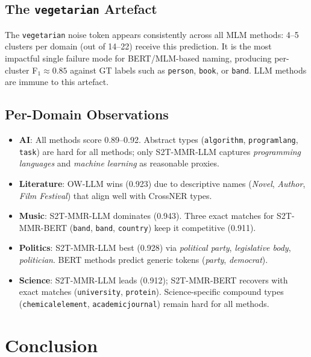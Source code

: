 \documentclass[11pt,a4paper]{article}
\begin{document}
\subsection{The \texttt{vegetarian} Artefact}

The \texttt{vegetarian} noise token appears consistently across all MLM
methods: 4--5 clusters per domain (out of 14--22) receive this prediction.
It is the most impactful single failure mode for BERT/MLM-based naming,
producing per-cluster F$_1 \approx 0.85$ against GT labels such as
\texttt{person}, \texttt{book}, or \texttt{band}.
LLM methods are immune to this artefact.

\subsection{Per-Domain Observations}

\begin{itemize}[leftmargin=1.5em]
  \item \textbf{AI}: All methods score 0.89--0.92. Abstract types
    (\texttt{algorithm}, \texttt{programlang}, \texttt{task}) are hard for
    all methods; only S2T-MMR-LLM captures \textit{programming languages}
    and \textit{machine learning} as reasonable proxies.
  \item \textbf{Literature}: OW-LLM wins (0.923) due to descriptive names
    (\textit{Novel}, \textit{Author}, \textit{Film Festival}) that align
    well with CrossNER types.
  \item \textbf{Music}: S2T-MMR-LLM dominates (0.943). Three exact matches
    for S2T-MMR-BERT (\texttt{band}, \texttt{band}, \texttt{country})
    keep it competitive (0.911).
  \item \textbf{Politics}: S2T-MMR-LLM best (0.928) via \textit{political
    party}, \textit{legislative body}, \textit{politician}. BERT methods
    predict generic tokens (\textit{party}, \textit{democrat}).
  \item \textbf{Science}: S2T-MMR-LLM leads (0.912); S2T-MMR-BERT recovers
    with exact matches (\texttt{university}, \texttt{protein}).
    Science-specific compound types (\texttt{chemicalelement},
    \texttt{academicjournal}) remain hard for all methods.
\end{itemize}

\section{Conclusion}
\end{document}
